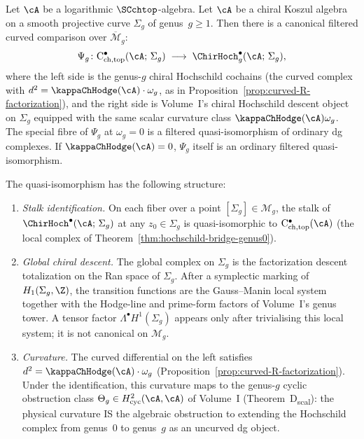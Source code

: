 \begin{theorem}
\label{thm:hochschild-bridge-higher-genus}
Let\/ $\cA$ be a logarithmic\/ $\SCchtop$-algebra. Let $\cA$ be a chiral Koszul algebra
on a smooth projective curve $\Sigma_g$ of genus~$g \geq 1$.
Then there is a canonical filtered curved comparison over
\(\overline{\mathcal{M}}_g\):
\begin{equation}\label{eq:hochschild-bridge-genus-g}
\Psi_g\colon
\mathrm{C}^\bullet_{\mathrm{ch,top}}(\cA;\, \Sigma_g)
\;\longrightarrow\;
\ChirHoch^\bullet_g(\cA;\, \Sigma_g),
\end{equation}
where the left side is the genus-$g$ chiral Hochschild cochains
(the curved complex with $d^2 = \kappaChHodge(\cA) \cdot \omega_g$, as
in Proposition~\textup{\ref{prop:curved-R-factorization}}), and
the right side is Volume~I's chiral Hochschild descent object on
\(\Sigma_g\) equipped with the same scalar curvature class
\(\kappaChHodge(\cA)\omega_g\). The special fibre of \(\Psi_g\) at
\(\omega_g=0\) is a filtered quasi-isomorphism of ordinary dg
complexes. If \(\kappaChHodge(\cA)=0\), \(\Psi_g\) itself is an
ordinary filtered quasi-isomorphism.

The quasi-isomorphism has the following structure:
\begin{enumerate}[label=\textup{(\roman*)}]
\item \emph{Stalk identification.}
 On each fiber over a point $[\Sigma_g] \in \mathcal{M}_g$,
 the stalk of $\ChirHoch^\bullet(\cA;\, \Sigma_g)$ at any
 $z_0 \in \Sigma_g$ is quasi-isomorphic to
 $\mathrm{C}^\bullet_{\mathrm{ch,top}}(\cA)$ (the local
 complex of Theorem~\textup{\ref{thm:hochschild-bridge-genus0}}).

\item \emph{Global chiral descent.}
 The global complex on $\Sigma_g$ is the factorization descent
 totalization on the Ran space of $\Sigma_g$. After a symplectic
 marking of \(H_1(\Sigma_g,\Z)\), the transition functions are the
 Gauss--Manin local system together with the Hodge-line and prime-form
 factors of Volume~I's genus tower. A tensor factor
 \(\Lambda^\bullet H^1(\Sigma_g)\) appears only after trivialising this
 local system; it is not canonical on \(\mathcal M_g\).

\item \emph{Curvature.}
The curved differential on the left satisfies
$d^2 = \kappaChHodge(\cA) \cdot \omega_g$
(Proposition~\textup{\ref{prop:curved-R-factorization}}).
Under the identification, this curvature maps to the
 genus-$g$ cyclic obstruction class
 \(\Theta_g\in H^2_{\mathrm{cyc}}(\cA,\cA)\) of Volume~I
 (Theorem~D\textsubscript{scal}): the physical curvature IS the
 algebraic obstruction to extending the Hochschild complex
 from genus~$0$ to genus~$g$ as an uncurved dg object.


\end{enumerate}
\end{theorem}
